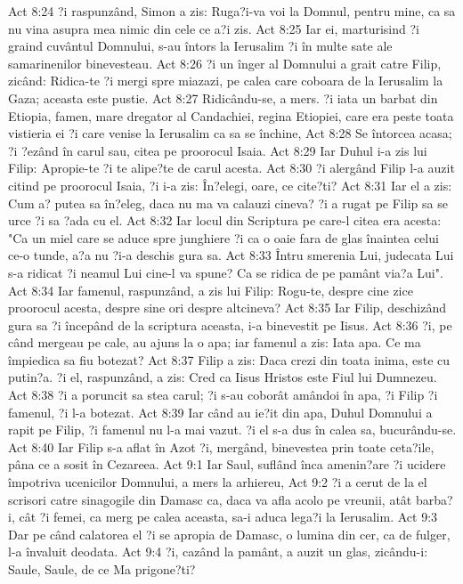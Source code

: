 Act 8:24  ?i raspunzând, Simon a zis: Ruga?i-va voi la Domnul, pentru mine, ca sa nu vina asupra mea nimic din cele ce a?i zis.
Act 8:25  Iar ei, marturisind ?i graind cuvântul Domnului, s-au întors la Ierusalim ?i în multe sate ale samarinenilor binevesteau.
Act 8:26  ?i un înger al Domnului a grait catre Filip, zicând: Ridica-te ?i mergi spre miazazi, pe calea care coboara de la Ierusalim la Gaza; aceasta este pustie.
Act 8:27  Ridicându-se, a mers. ?i iata un barbat din Etiopia, famen, mare dregator al Candachiei, regina Etiopiei, care era peste toata vistieria ei ?i care venise la Ierusalim ca sa se închine,
Act 8:28  Se întorcea acasa; ?i ?ezând în carul sau, citea pe proorocul Isaia.
Act 8:29  Iar Duhul i-a zis lui Filip: Apropie-te ?i te alipe?te de carul acesta.
Act 8:30  ?i alergând Filip l-a auzit citind pe proorocul Isaia, ?i i-a zis: În?elegi, oare, ce cite?ti?
Act 8:31  Iar el a zis: Cum a? putea sa în?eleg, daca nu ma va calauzi cineva? ?i a rugat pe Filip sa se urce ?i sa ?ada cu el.
Act 8:32  Iar locul din Scriptura pe care-l citea era acesta: "Ca un miel care se aduce spre junghiere ?i ca o oaie fara de glas înaintea celui ce-o tunde, a?a nu ?i-a deschis gura sa.
Act 8:33  Întru smerenia Lui, judecata Lui s-a ridicat ?i neamul Lui cine-l va spune? Ca se ridica de pe pamânt via?a Lui".
Act 8:34  Iar famenul, raspunzând, a zis lui Filip: Rogu-te, despre cine zice proorocul acesta, despre sine ori despre altcineva?
Act 8:35  Iar Filip, deschizând gura sa ?i începând de la scriptura aceasta, i-a binevestit pe Iisus.
Act 8:36  ?i, pe când mergeau pe cale, au ajuns la o apa; iar famenul a zis: Iata apa. Ce ma împiedica sa fiu botezat?
Act 8:37  Filip a zis: Daca crezi din toata inima, este cu putin?a. ?i el, raspunzând, a zis: Cred ca Iisus Hristos este Fiul lui Dumnezeu.
Act 8:38  ?i a poruncit sa stea carul; ?i s-au coborât amândoi în apa, ?i Filip ?i famenul, ?i l-a botezat.
Act 8:39  Iar când au ie?it din apa, Duhul Domnului a rapit pe Filip, ?i famenul nu l-a mai vazut. ?i el s-a dus în calea sa, bucurându-se.
Act 8:40  Iar Filip s-a aflat în Azot ?i, mergând, binevestea prin toate ceta?ile, pâna ce a sosit în Cezareea.
Act 9:1  Iar Saul, suflând înca amenin?are ?i ucidere împotriva ucenicilor Domnului, a mers la arhiereu,
Act 9:2  ?i a cerut de la el scrisori catre sinagogile din Damasc ca, daca va afla acolo pe vreunii, atât barba?i, cât ?i femei, ca merg pe calea aceasta, sa-i aduca lega?i la Ierusalim.
Act 9:3  Dar pe când calatorea el ?i se apropia de Damasc, o lumina din cer, ca de fulger, l-a învaluit deodata.
Act 9:4  ?i, cazând la pamânt, a auzit un glas, zicându-i: Saule, Saule, de ce Ma prigone?ti?
